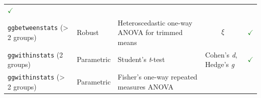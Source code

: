 \documentclass[
]{article}
\begin{document}
\begin{longtable}[]{@{}lllll@{}}
\begin{minipage}[t]{0.07\columnwidth}
\textcolor{ForestGreen}{$\checkmark$}\strut
\end{minipage}\tabularnewline
\begin{minipage}[t]{0.20\columnwidth}\raggedright
\texttt{ggbetweenstats} (\textgreater{} 2 groups)\strut
\end{minipage} & \begin{minipage}[t]{0.16\columnwidth}\raggedright
Robust\strut
\end{minipage} & \begin{minipage}[t]{0.31\columnwidth}\raggedright
Heteroscedastic one-way ANOVA for trimmed means\strut
\end{minipage} & \begin{minipage}[t]{0.12\columnwidth}\raggedright
\[\xi\]\strut
\end{minipage} & \begin{minipage}[t]{0.07\columnwidth}\raggedright
\textcolor{ForestGreen}{$\checkmark$}\strut
\end{minipage}\tabularnewline
\begin{minipage}[t]{0.20\columnwidth}\raggedright
\texttt{ggwithinstats} (2 groups)\strut
\end{minipage} & \begin{minipage}[t]{0.16\columnwidth}\raggedright
Parametric\strut
\end{minipage} & \begin{minipage}[t]{0.31\columnwidth}\raggedright
Student's \emph{t}-test\strut
\end{minipage} & \begin{minipage}[t]{0.12\columnwidth}\raggedright
Cohen's \emph{d}, Hedge's \emph{g}\strut
\end{minipage} & \begin{minipage}[t]{0.07\columnwidth}\raggedright
\textcolor{ForestGreen}{$\checkmark$}\strut
\end{minipage}\tabularnewline
\begin{minipage}[t]{0.20\columnwidth}\raggedright
\texttt{ggwithinstats} (\textgreater{} 2 groups)\strut
\end{minipage} & \begin{minipage}[t]{0.16\columnwidth}\raggedright
Parametric\strut
\end{minipage} & \begin{minipage}[t]{0.31\columnwidth}\raggedright
Fisher's one-way repeated measures ANOVA\strut
\end{minipage} & \begin{minipage}[t]{0.12\columnwidth}\raggedright

\end{minipage}
\end{longtable}
\end{document}
